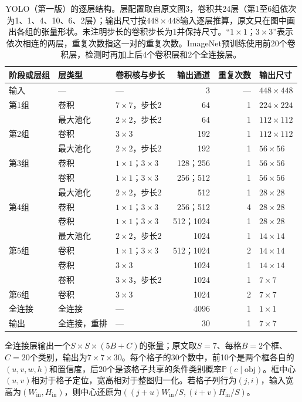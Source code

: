 \begin{table}[tbp]
 \centering
 \small
 \begin{tabular}{@{}lllrrl@{}}
 \toprule
 阶段或层组 & 层类型 & 卷积核与步长 & 输出通道 & 重复次数 & 输出尺寸\\
 \midrule
 输入 & — & — & 3 & — & $448\times448$\\
 第1组 & 卷积 & $7\times7$，步长2 & 64 & 1 & $224\times224$\\
       & 最大池化 & $2\times2$，步长2 & 64 & 1 & $112\times112$\\
 第2组 & 卷积 & $3\times3$ & 192 & 1 & $112\times112$\\
       & 最大池化 & $2\times2$，步长2 & 192 & 1 & $56\times56$\\
 第3组 & 卷积 & $1\times1$；$3\times3$ & 128；256 & 1 & $56\times56$\\
       & 卷积 & $1\times1$；$3\times3$ & 256；512 & 1 & $56\times56$\\
       & 最大池化 & $2\times2$，步长2 & 512 & 1 & $28\times28$\\
 第4组 & 卷积 & $1\times1$；$3\times3$ & 256；512 & 4 & $28\times28$\\
       & 卷积 & $1\times1$；$3\times3$ & 512；1024 & 1 & $28\times28$\\
       & 最大池化 & $2\times2$，步长2 & 1024 & 1 & $14\times14$\\
 第5组 & 卷积 & $1\times1$；$3\times3$ & 512；1024 & 2 & $14\times14$\\
       & 卷积 & $3\times3$ & 1024 & 1 & $14\times14$\\
       & 卷积 & $3\times3$，步长2 & 1024 & 1 & $7\times7$\\
 第6组 & 卷积 & $3\times3$ & 1024 & 2 & $7\times7$\\
 全连接 & 全连接 & — & 4096 & 1 & $1\times1$\\
 输出 & 全连接，重排 & — & 30 & 1 & $7\times7$\\
 \bottomrule
 \end{tabular}
 \caption{YOLO（第一版）的逐层结构。层配置取自原文图3，卷积共24层（第1至6组依次为1、1、4、10、6、2层）；输出尺寸按$448\times448$输入逐层推算，原文只在图中画出各组的张量形状。未注明步长的卷积步长为1并保持尺寸。“$1\times1$；$3\times3$”表示依次相连的两层，重复次数指这一对的重复次数。ImageNet预训练使用前20个卷积层，检测时再加上后4个卷积层和2个全连接层。}
 \label{tab:vision-recognition-yolo-layers}
\end{table}

全连接层输出一个$S\times S\times(5B+C)$的张量；原文取$S=7$、每格$B=2$个框、$C=20$个类别，输出为$7\times7\times30$。每个格子的30个数中，前10个是两个框各自的$(u,v,w,h)$和置信度，后20个是该格子共享的条件类别概率$\mathbb{P}(c\mid\mathrm{obj})$。框中心$(u,v)$相对于格子定位，宽高相对于整图归一化。若格子列行为$(j,i)$，输入宽高为$(W_{\mathrm{in}},H_{\mathrm{in}})$，则中心还原为$((j+u)W_{\mathrm{in}}/S,(i+v)H_{\mathrm{in}}/S)$。

